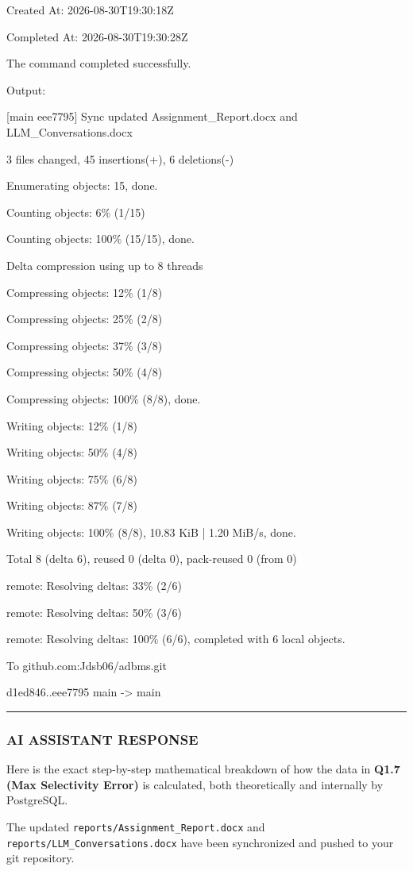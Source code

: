 \documentclass[11pt,a4paper]{article}
\begin{document}
{Created At: 2026-08-30T19:30:18Z

Completed At: 2026-08-30T19:30:28Z


The command completed successfully.

Output:

[main eee7795] Sync updated Assignment\_Report.docx and LLM\_Conversations.docx

3 files changed, 45 insertions(+), 6 deletions(-)

Enumerating objects: 15, done.

Counting objects:   6\% (1/15)

Counting objects: 100\% (15/15), done.

Delta compression using up to 8 threads

Compressing objects:  12\% (1/8)

Compressing objects:  25\% (2/8)

Compressing objects:  37\% (3/8)

Compressing objects:  50\% (4/8)

Compressing objects: 100\% (8/8), done.

Writing objects:  12\% (1/8)

Writing objects:  50\% (4/8)

Writing objects:  75\% (6/8)

Writing objects:  87\% (7/8)

Writing objects: 100\% (8/8), 10.83 KiB | 1.20 MiB/s, done.

Total 8 (delta 6), reused 0 (delta 0), pack-reused 0 (from 0)

remote: Resolving deltas:  33\% (2/6)

remote: Resolving deltas:  50\% (3/6)

remote: Resolving deltas: 100\% (6/6), completed with 6 local objects.

To github.com:Jdsb06/adbms.git

d1ed846..eee7795  main -> main


\hrule

\subsubsection{AI ASSISTANT RESPONSE}

Here is the exact step-by-step mathematical breakdown of how the data in \textbf{Q1.7 (Max Selectivity Error)} is calculated, both theoretically and internally by PostgreSQL.


The updated \texttt{reports/Assignment\_Report.docx} and \texttt{reports/LLM\_Conversations.docx} have been synchronized and pushed to your git repository.


}
\end{document}
